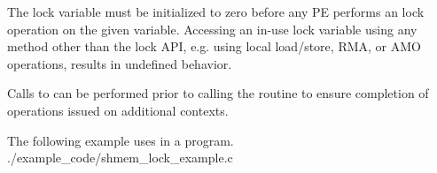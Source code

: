 \begin{apidefinition}
{    The lock variable must be initialized to zero before any PE performs an
    \openshmem lock operation on the given variable.  Accessing an in-use lock
    variable using any method other than the \openshmem lock API, e.g. using
    local load/store, RMA, or AMO operations, results in undefined behavior.

    Calls to  can be performed prior to calling the
     routine to ensure completion of operations issued
    on additional contexts.
}

\begin{apiexamples}

\apicexample
    {The following example uses  in a \Cstd[11] program.}
    {./example_code/shmem_lock_example.c}
    {}

\end{apiexamples}

\end{apidefinition}
